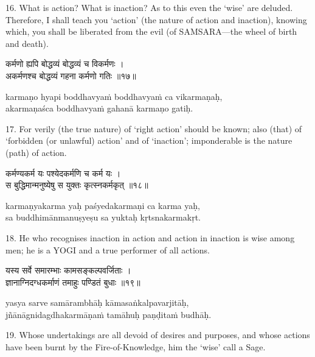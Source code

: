 16. What is action? What is inaction? As to this even the `wise' are deluded.
Therefore, I shall teach you `action' (the nature of action and inaction),
knowing which, you shall be liberated from the evil (of SAMSARA---the wheel of
birth and death).

\begin{gitaverse}
कर्मणो ह्यपि बोद्धव्यं बोद्धव्यं च विकर्मणः । \\
अकर्मणश्च बोद्धव्यं गहना कर्मणो गतिः ॥१७॥
\end{gitaverse}

\begin{transliteration}
karmaṇo hyapi boddhavyaṁ boddhavyaṁ ca vikarmaṇaḥ, \\
akarmaṇaśca boddhavyaṁ gahanā karmaṇo gatiḥ.
\end{transliteration}

17. For verily (the true nature) of `right action' should be known; also (that)
of `forbidden (or unlawful) action' and of `inaction'; imponderable is the
nature (path) of action.

\begin{gitaverse}
कर्मण्यकर्म यः पश्येदकर्मणि च कर्म यः । \\
स बुद्धिमान्मनुष्येषु स युक्तः कृत्स्नकर्मकृत् ॥१८॥
\end{gitaverse}

\begin{transliteration}
karmaṇyakarma yaḥ paśyedakarmaṇi ca karma yaḥ, \\
sa buddhimānmanuṣyeṣu sa yuktaḥ kṛtsnakarmakṛt.
\end{transliteration}

18. He who recognises inaction in action and action in inaction is wise among
men; he is a YOGI and a true performer of all actions.

\begin{gitaverse}
यस्य सर्वे समारम्भाः कामसङ्कल्पवर्जिताः । \\
ज्ञानाग्निदग्धकर्माणं तमाहुः पण्डितं बुधाः ॥१९॥
\end{gitaverse}

\begin{transliteration}
yasya sarve samārambhāḥ kāmasaṅkalpavarjitāḥ, \\
jñānāgnidagdhakarmāṇaṁ tamāhuḥ paṇḍitaṁ budhāḥ.
\end{transliteration}

19. Whose undertakings are all devoid of desires and purposes, and whose
actions have been burnt by the Fire-of-Knowledge, him the `wise' call a Sage.

